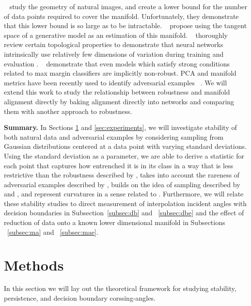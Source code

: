 ~\citet{khoury2018} study the geometry of natural images, and create a lower bound for the number of data points required to cover the manifold.
Unfortunately, they demonstrate that this lower bound is so large as to be intractable.
~\citet{shamir2021dimpled} propose using the tangent space of a
generative model as an estimation of this
manifold. ~\citet{magai2022topology} thoroughly review certain
topological properties to demonstrate that neural networks
intrinsically use relatively few dimensions of variation during
training and evaluation . ~\citet{vardi2022gradient} demonstrate that even models which satisfy strong conditions related to max margin classifiers are implicitly non-robust. PCA and manifold metrics have been recently used to identify adversarial examples ~\citep{aparne2022pca, nguyen-minh-luu-2022-textual}. We will extend this work to study the relationship between robustness and manifold alignment directly by baking alignment directly into networks and comparing them with another approach to robustness. 

{\bf Summary.}
 In Sections \ref{sec:meth} and \ref{sec:experiments}, we will investigate stability of both natural data and adversarial examples by considering sampling from Gaussian distributions centered at a data point with varying standard deviations. Using the standard deviation as a parameter, we are able to derive a statistic for each point that captures how entrenched it is in its class in a way that is less restrictive than the robustness described by \citet{khoury2018}, takes into account the rareness of adversarial examples described by \citet{yu2019new}, builds on the idea of sampling described by \citet{roth19aodds} and \citet{hosseini2019odds}, and represent curvatures in a sense related to \citet{Fawzi2018empirical}. Furthermore, we will relate these stability studies to direct measurement of interpolation incident angles with decision boundaries in Subsection~\ref{subsec:db} and ~\ref{subsec:dbe} and the effect of reduction of data onto a known lower dimensional manifold in Subsections ~\ref{subsec:ma} and ~\ref{subsec:mae}.  

\section{Methods} \label{sec:meth} %

In this section we will lay out the theoretical framework for studying stability, persistence, and decision boundary corssing-angles. 


